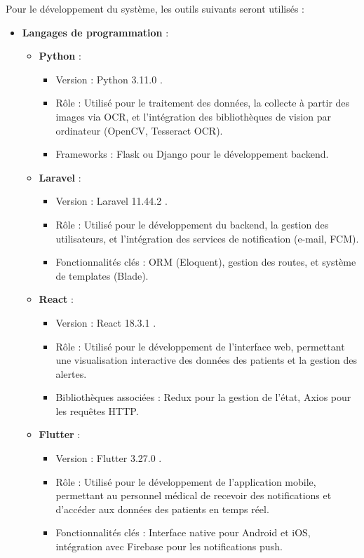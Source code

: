 Pour le développement du système, les outils suivants seront utilisés :

\begin{itemize}
    \item \textbf{Langages de programmation} :
    \begin{itemize}
        \item \textbf{Python} :
            \begin{itemize}
                \item Version : Python 3.11.0 .
                \item Rôle : Utilisé pour le traitement des données, la collecte à partir des images via OCR, et l'intégration des bibliothèques de vision par ordinateur (OpenCV, Tesseract OCR).
                \item Frameworks : Flask ou Django pour le développement backend.
            \end{itemize}
        \item \textbf{Laravel} :
            \begin{itemize}
                \item Version : Laravel 11.44.2 .
                \item Rôle : Utilisé pour le développement du backend, la gestion des utilisateurs, et l'intégration des services de notification (e-mail, FCM).
                \item Fonctionnalités clés : ORM (Eloquent), gestion des routes, et système de templates (Blade).
            \end{itemize}
        \item \textbf{React} :
            \begin{itemize}
                \item Version : React 18.3.1 .
                \item Rôle : Utilisé pour le développement de l'interface web, permettant une visualisation interactive des données des patients et la gestion des alertes.
                \item Bibliothèques associées : Redux pour la gestion de l'état, Axios pour les requêtes HTTP.
            \end{itemize}
        \item \textbf{Flutter} :
            \begin{itemize}
                \item Version : Flutter 3.27.0 .
                \item Rôle : Utilisé pour le développement de l'application mobile, permettant au personnel médical de recevoir des notifications et d'accéder aux données des patients en temps réel.
                \item Fonctionnalités clés : Interface native pour Android et iOS, intégration avec Firebase pour les notifications push.
            \end{itemize}
    \end{itemize}


\end{itemize}
